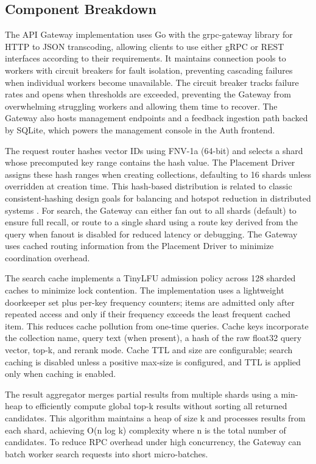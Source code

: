 \documentclass[conference]{IEEEtran}
\begin{document}
\subsection{Component Breakdown}

The API Gateway implementation uses Go with the grpc-gateway library for HTTP to JSON transcoding, allowing clients to use either gRPC or REST interfaces according to their requirements. It maintains connection pools to workers with circuit breakers for fault isolation, preventing cascading failures when individual workers become unavailable. The circuit breaker tracks failure rates and opens when thresholds are exceeded, preventing the Gateway from overwhelming struggling workers and allowing them time to recover. The Gateway also hosts management endpoints and a feedback ingestion path backed by SQLite, which powers the management console in the Auth frontend.

The request router hashes vector IDs using FNV-1a (64-bit) \cite{fnv} and selects a shard whose precomputed key range contains the hash value. The Placement Driver assigns these hash ranges when creating collections, defaulting to 16 shards unless overridden at creation time. This hash-based distribution is related to classic consistent-hashing design goals for balancing and hotspot reduction in distributed systems \cite{consistenthashing}. For search, the Gateway can either fan out to all shards (default) to ensure full recall, or route to a single shard using a route key derived from the query when fanout is disabled for reduced latency or debugging. The Gateway uses cached routing information from the Placement Driver to minimize coordination overhead.

The search cache implements a TinyLFU admission policy \cite{tinyLFU} across 128 sharded caches to minimize lock contention. The implementation uses a lightweight doorkeeper set plus per-key frequency counters; items are admitted only after repeated access and only if their frequency exceeds the least frequent cached item. This reduces cache pollution from one-time queries. Cache keys incorporate the collection name, query text (when present), a hash of the raw float32 query vector, top-k, and rerank mode. Cache TTL and size are configurable; search caching is disabled unless a positive max-size is configured, and TTL is applied only when caching is enabled.

The result aggregator merges partial results from multiple shards using a min-heap to efficiently compute global top-k results without sorting all returned candidates. This algorithm maintains a heap of size k and processes results from each shard, achieving O(n log k) complexity where n is the total number of candidates. To reduce RPC overhead under high concurrency, the Gateway can batch worker search requests into short micro-batches.
\end{document}
